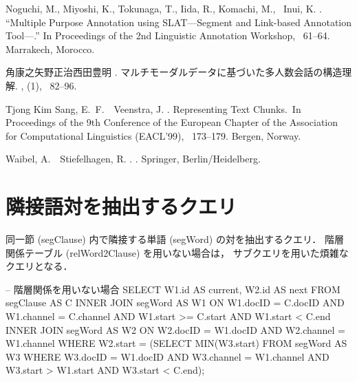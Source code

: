 \documentclass[japanese]{jnlp_1.4}
\newenvironment{query}{}{}
\begin{document}
\begin{thebibliography}{}
Noguchi, M., Miyoshi, K., Tokunaga, T., Iida, R., Komachi, M., \BBA\ Inui, K.
  \BBOP 2008\BBCP.
\newblock ``Multiple Purpose Annotation using {SLAT}---Segment and
  Link-based Annotation Tool---.'' 
\newblock In {\Bem Proceedings of the 2nd Linguistic Annotation Workshop},
  \mbox{\BPGS\ 61--64}. Marrakech, Morocco.

角康之\JBA 矢野正治\JBA 西田豊明 \BBOP 2011\BBCP.
\newblock マルチモーダルデータに基づいた多人数会話の構造理解. 
\newblock {}, {}  (1), \mbox{\BPGS\ 82--96}.

{Tjong Kim Sang}, E.~F.\BBACOMMA\ \BBA\ Veenstra, J. \BBOP 1999\BBCP.
\newblock \BBOQ Representing Text Chunks.\BBCQ\
\newblock In {\Bem Proceedings of the 9th Conference of the European Chapter of
  the Association for Computational Linguistics (EACL'99)}, \mbox{\BPGS\
  173--179}. Bergen, Norway.

Waibel, A.\BBACOMMA\ \BBA\ Stiefelhagen, R. \BBOP 2009\BBCP.
.
\newblock Springer, Berlin/Heidelberg.

\end{thebibliography}



\appendix
\section{隣接語対を抽出するクエリ}
\label{sec:bigram}

同一節 (segClause) 内で隣接する単語 (segWord) の対を抽出するクエリ．
階層関係テーブル (relWord2Clause) を用いない場合は，
サブクエリを用いた煩雑なクエリとなる．

\begin{query}
-- 階層関係を用いない場合
SELECT W1.id AS current, W2.id AS next
  FROM segClause AS C
 INNER JOIN segWord AS W1 ON W1.docID = C.docID AND W1.channel = C.channel
                         AND W1.start >= C.start AND W1.start < C.end
 INNER JOIN segWord AS W2 ON W2.docID = W1.docID AND W2.channel = W1.channel
 WHERE W2.start = (SELECT MIN(W3.start)
                     FROM segWord AS W3
                    WHERE W3.docID = W1.docID AND W3.channel = W1.channel
                      AND W3.start > W1.start AND W3.start < C.end);
\end{query}
\end{document}
